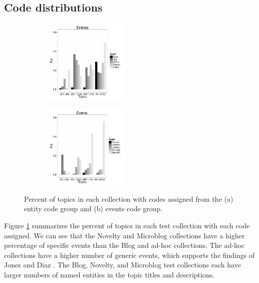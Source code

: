 \documentclass{sig-alternate-05-2015}
\begin{document}
\subsection{Code distributions}

\begin{figure}[!ht]
\centering
\begin{subfigure}{.25\textwidth}
  \centering
\includegraphics[width=4.5cm, height=4cm]{plots/topic-groups-ent.pdf}
\end{subfigure}%
\begin{subfigure}{.25\textwidth}
  \centering
\includegraphics[width=4.5cm, height=4cm]{plots/topic-groups-evt.pdf}
\end{subfigure}
\caption{Percent of topics in each collection with codes assigned from the (a) entity code group and (b) events code group.}
\vspace{-.75em}
\label{fig.codedist}
\end{figure}

Figure \ref{fig.codedist} summarizes the percent of topics in each test collection with each code assigned. We can see that the Novelty and Microblog  collections have a higher percentage of specific events than the Blog and ad-hoc collections. The ad-hoc collections have a higher number of generic events, which supports the findings of Jones and Diaz \cite{Jones2007}. The Blog, Novelty, and Microblog test collections each have larger numbers of named entities in the topic titles and descriptions.
\end{document}
